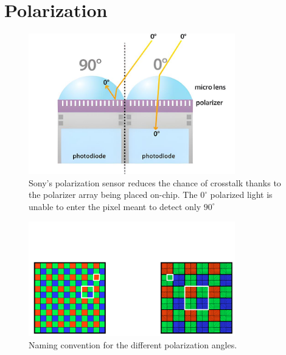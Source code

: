 \section{Polarization}

\begin{figure}
    \centering
    \includegraphics[width=0.8\textwidth]{figures/crosstalk_off_upscaled.jpg}
    \caption{Sony's polarization sensor reduces the chance of crosstalk thanks to the polarizer array being placed on-chip. The $0^{\circ}$ polarized light is unable to enter the pixel meant to detect only $90^{\circ}$ \cite{lucidvisionlabsPolarizationExplainedSony2018}}
    \label{fig:camera_no_crosstalk}
\end{figure}

\begin{figure}
    \centering
    \includegraphics[width=0.8\textwidth]{figures/polarized_image/naming.pdf}
    \caption{Naming convention for the different polarization angles.}
    \label{fig:polarization_naming}
\end{figure}


